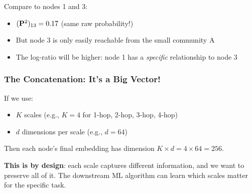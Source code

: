 \begin{notechapter}
\begin{example}
Compare to nodes 1 and 3:
\begin{itemize}
    \item $(\mathbf{P}^2)_{13} = 0.17$ (same raw probability!)
    \item But node 3 is only easily reachable from the small community A
    \item The log-ratio will be higher: node 1 has a \emph{specific} relationship to node 3
\end{itemize}
\end{example}

\subsubsection*{The Concatenation: It's a Big Vector!}

\begin{keyinsight}
If we use:
\begin{itemize}
    \item $K$ scales (e.g., $K = 4$ for 1-hop, 2-hop, 3-hop, 4-hop)
    \item $d$ dimensions per scale (e.g., $d = 64$)
\end{itemize}
Then each node's final embedding has dimension $K \times d = 4 \times 64 = 256$.

\textbf{This is by design}: each scale captures different information, and we want to preserve all of it. The downstream ML algorithm can learn which scales matter for the specific task.
\end{keyinsight}

\begin{figure}[htbp]
\centering
{}
\end{figure}
\end{notechapter}
